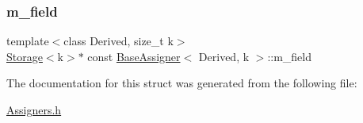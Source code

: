 \subsubsection{\texorpdfstring{m\+\_\+field}{m\_field}}
{\footnotesize\ttfamily template$<$class Derived, size\+\_\+t k$>$ \\
\hyperlink{Includes_8h_ae7d375db701e28425a3faea2827f134b}{Storage}$<$k$>$$\ast$ const \hyperlink{structBaseAssigner}{Base\+Assigner}$<$ Derived, k $>$\+::m\+\_\+field\hspace{0.3cm}{\ttfamily [protected]}}



The documentation for this struct was generated from the following file\+:\begin{DoxyCompactItemize}
\item 
\hyperlink{Assigners_8h}{Assigners.\+h}\end{DoxyCompactItemize}
